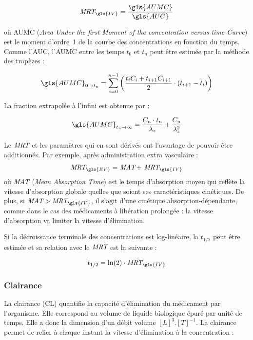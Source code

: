 \begin{equation}
\MRT_{\gls{IV}} = \frac{\gls{AUMC}}{\gls{AUC}}
\label{eq:6}
\end{equation}

où \gls{AUMC} (\textit{Area Under the first Moment of the concentration versus time Curve}) est le moment d'ordre~1 de la courbe des concentrations en fonction du temps. Comme l'\gls{AUC}, l'\gls{AUMC} entre les temps $t_0$ et $t_n$ peut être estimée par la méthode des trapèzes :

\begin{equation}
\gls{AUMC}_{0 \to t_n} = \sum_{i=0}^{n-1}\left ( \frac{t_i C_i + t_{i+1}C_{i+1}}{2}\cdot \left ( t_{i+1}-t_i \right ) \right )
\label{eq:7}
\end{equation}

La fraction extrapolée à l'infini est obtenue par :

\begin{equation}
\gls{AUMC}_{t_n \to \infty} = \frac{C_n \cdot t_n}{\lambda_z}+\frac{C_n }{\lambda_z^2}
\label{eq:8}
\end{equation}

Le $\operatorname{\textit{MRT}}$ et les paramètres qui en sont dérivés ont l'avantage de pouvoir être additionnés. Par exemple, après administration extra vasculaire :
\begin{equation}
\MRT_{\gls{EV}} = \MAT + \, \MRT_{\gls{IV}}
\label{eq:9}
\end{equation}
où $\operatorname{\textit{MAT}}$ (\textit{Mean Absorption Time}) est le temps d'absorption moyen qui reflète la vitesse d'absorption globale quelles que soient ses caractéristiques cinétiques. De plus, si $\MAT > \MRT_{\gls{IV}}$, il s'agit d'une cinétique absorption-dépendante, comme dans le cas des médicaments à libération prolongée : la vitesse d'absorption va limiter la vitesse d'élimination.

Si la décroissance terminale des concentrations est log-linéaire, la $t_{1/2}$ peut être estimée et sa relation avec le $\operatorname{\textit{MRT}}$ est la suivante :

\begin{equation}
t_{1/2} = \ln(2)\cdot \MRT_{\gls{IV}}
\label{eq:10}
\end{equation}

\subsubsection{Clairance} 
La clairance (\gls{CL}) quantifie la capacité d'élimination du médicament par l'organisme. Elle correspond au volume de liquide biologique épuré par unité de temps. Elle a donc la dimension d'un débit volume $[L]^3.[T]^{-1}$. La clairance permet de relier à chaque instant la vitesse d'élimination à la concentration :

